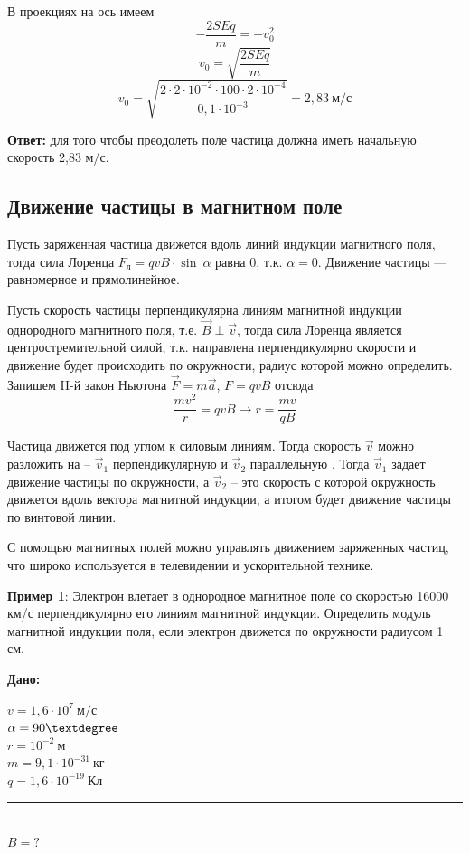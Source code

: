 \documentclass[a6paper, 11pt]{diss_4}
\newcommand{\TNF}{$\vec{F}=m\vec{a}$}
\renewcommand{\'}{\,'}
\begin{document}
В проекциях на ось имеем
\[
-\frac{2SEq}{m}=-v^2_0
\]
\[
v_0=\sqrt{\frac{2SEq}{m}}
\]
\[
v_0=\sqrt{\frac{2\cdot2\cdot10^{-2}\cdot100\cdot2\cdot10^{-4}}{0,1\cdot10^{-3}}}=2,83\ м/с
\]

\textbf{Ответ:}  для того чтобы преодолеть поле частица должна иметь начальную скорость 2,83 м/с.


\subsection{Движение частицы в магнитном поле}

Пусть заряженная частица движется вдоль линий индукции магнитного поля, тогда сила Лоренца $F_л=qvB\cdot \sin\ \alpha$
равна 0, т.к. $\alpha=0$. Движение частицы --- равномерное и прямолинейное.

Пусть скорость частицы перпендикулярна линиям магнитной индукции однородного магнитного поля, т.е. $\vec{B}\perp\vec{v}$,
тогда сила Лоренца является центростремительной силой, т.к. направлена перпендикулярно скорости и движение
будет происходить по окружности, радиус которой можно определить. Запишем II-й закон Ньютона \TNF,  $F=qvB$  отсюда
\[
\frac{mv^2}{r}=qvB\to
r=\frac{mv}{qB}
\]

Частица движется под углом к силовым линиям. Тогда скорость $\vec{v}$ можно разложить на -- $\vec{v}_1$ перпендикулярную и
$\vec{v}_2$ параллельную . Тогда $\vec{v}_1$ задает движение  частицы по окружности, а $\vec{v}_2$ --  это скорость с которой окружность движется вдоль вектора магнитной индукции, а итогом будет движение частицы по винтовой линии.

С помощью магнитных полей можно управлять движением заряженных частиц, что широко используется в телевидении и ускорительной технике.

\textbf{Пример 1}: Электрон влетает в однородное магнитное поле со скоростью 16000 км/с перпендикулярно его линиям магнитной индукции. Определить модуль магнитной индукции поля, если электрон движется по окружности радиусом 1 см.

\hspace{1cm}\textbf{Дано:}\hspace{.3cm}
\parbox[t]{4cm}{
$v = 1,6\cdot10^{7}\ м/с$\\
$\alpha = 90\textdegree$\\
$r = 10^{-2}\ м$\\
$m = 9,1\cdot10^{-31}\ кг$\\
$q = 1,6\cdot10^{-19}\ Кл$\\
\rule{4cm}{.4pt}\\
$B = ?$\\
}
\end{document}
